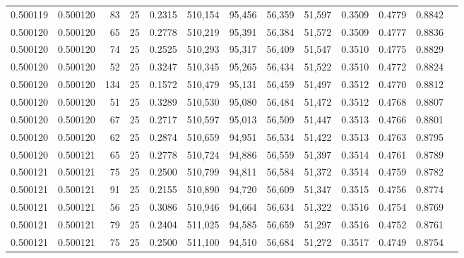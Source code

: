 \begin{tabular}{rrrrrrrrrrrrr}
0.500119 & 0.500120 &    83 &  25 &                                     0.2315 & 510,154 &  95,456 &  56,359 &  51,597 & 0.3509 & 0.4779 & 0.8842 \\
0.500120 & 0.500120 &    65 &  25 &                                     0.2778 & 510,219 &  95,391 &  56,384 &  51,572 & 0.3509 & 0.4777 & 0.8836 \\
0.500120 & 0.500120 &    74 &  25 &                                     0.2525 & 510,293 &  95,317 &  56,409 &  51,547 & 0.3510 & 0.4775 & 0.8829 \\
0.500120 & 0.500120 &    52 &  25 &                                     0.3247 & 510,345 &  95,265 &  56,434 &  51,522 & 0.3510 & 0.4772 & 0.8824 \\
0.500120 & 0.500120 &   134 &  25 &                                     0.1572 & 510,479 &  95,131 &  56,459 &  51,497 & 0.3512 & 0.4770 & 0.8812 \\
0.500120 & 0.500120 &    51 &  25 &                                     0.3289 & 510,530 &  95,080 &  56,484 &  51,472 & 0.3512 & 0.4768 & 0.8807 \\
0.500120 & 0.500120 &    67 &  25 &                                     0.2717 & 510,597 &  95,013 &  56,509 &  51,447 & 0.3513 & 0.4766 & 0.8801 \\
0.500120 & 0.500120 &    62 &  25 &                                     0.2874 & 510,659 &  94,951 &  56,534 &  51,422 & 0.3513 & 0.4763 & 0.8795 \\
0.500120 & 0.500121 &    65 &  25 &                                     0.2778 & 510,724 &  94,886 &  56,559 &  51,397 & 0.3514 & 0.4761 & 0.8789 \\
0.500121 & 0.500121 &    75 &  25 &                                     0.2500 & 510,799 &  94,811 &  56,584 &  51,372 & 0.3514 & 0.4759 & 0.8782 \\
0.500121 & 0.500121 &    91 &  25 &                                     0.2155 & 510,890 &  94,720 &  56,609 &  51,347 & 0.3515 & 0.4756 & 0.8774 \\
0.500121 & 0.500121 &    56 &  25 &                                     0.3086 & 510,946 &  94,664 &  56,634 &  51,322 & 0.3516 & 0.4754 & 0.8769 \\
0.500121 & 0.500121 &    79 &  25 &                                     0.2404 & 511,025 &  94,585 &  56,659 &  51,297 & 0.3516 & 0.4752 & 0.8761 \\
0.500121 & 0.500121 &    75 &  25 &                                     0.2500 & 511,100 &  94,510 &  56,684 &  51,272 & 0.3517 & 0.4749 & 0.8754 \\

\end{tabular}
